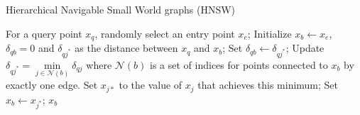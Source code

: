 \begin{algorithm}[!htb]
  \caption{Hierarchical Navigable Small World graphs (HNSW)}
  \label{alg:hnsw}
  \begin{algorithmic}[1]
  \STATE For a query point $x_q$, randomly select an entry point $x_e$;
  \STATE Initialize $x_b\leftarrow x_e$, $\delta_{qb}=0$ and $\delta_{qj^*}$ as the distance between $x_q$ and $x_b$;
  \STATE Set $\delta_{qb}\leftarrow\delta_{qj^*}$;
  \STATE Update $\delta_{qj^*}=\underset{j\in\mathcal{N}(b)}{\min}\delta_{qj}$ where $\mathcal{N}(b)$ is a set of indices for points connected to $x_b$ by exactly one edge. Set $x_{j*}$ to the value of $x_j$ that achieves this minimum;
  \STATE Set $x_b\leftarrow x_{j^*}$;
  \ENDWHILE
  \RETURN $x_b$
  \end{algorithmic}
\end{algorithm}
